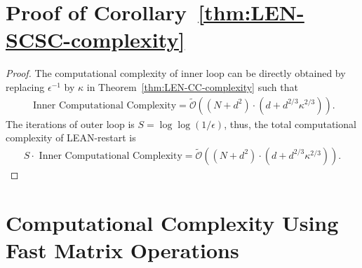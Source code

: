 \documentclass{article}
\def\gO{{\mathcal{O}}}
\theoremstyle{plain}
\begin{document}
\section{Proof of Corollary~\ref{thm:LEN-SCSC-complexity}}
\begin{proof}
The computational complexity of inner loop can be directly obtained by replacing $\epsilon^{-1}$ by $\kappa$ in Theorem~\ref{thm:LEN-CC-complexity} such that
\begin{align*}
 \text{ Inner Computational Complexity} =   \tilde{\gO}\left((N+d^2)\cdot(d+d^{2/3}\kappa^{2/3})\right).
\end{align*}
The iterations of outer loop is $S=\log\log(1/\epsilon)$, thus, the total computational complexity of LEAN-restart is 
\begin{align*}
    S\cdot\text{ Inner Computational Complexity} = \tilde{\gO}\left((N+d^2)\cdot(d+d^{2/3}\kappa^{2/3})\right).
\end{align*}
\end{proof}


\section{Computational Complexity Using Fast Matrix Operations} \label{apx:fast-matrix}
\end{document}
